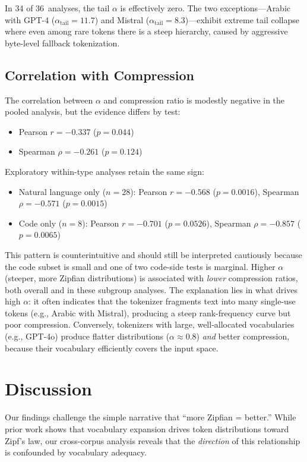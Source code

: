 \documentclass[11pt]{article}
\begin{document}
In 34 of 36~analyses, the tail $\alpha$ is effectively zero.
The two exceptions---Arabic with GPT-4 ($\alpha_\text{tail} = 11.7$) and Mistral ($\alpha_\text{tail} = 8.3$)---exhibit extreme tail collapse where even among rare tokens there is a steep hierarchy, caused by aggressive byte-level fallback tokenization.

\subsection{Correlation with Compression}

The correlation between $\alpha$ and compression ratio is modestly negative in the pooled analysis, but the evidence differs by test:
\begin{itemize}
  \item Pearson $r = -0.337$ ($p = 0.044$)
  \item Spearman $\rho = -0.261$ ($p = 0.124$)
\end{itemize}

Exploratory within-type analyses retain the same sign:
\begin{itemize}
  \item Natural language only ($n=28$): Pearson $r=-0.568$ ($p=0.0016$), Spearman $\rho=-0.571$ ($p=0.0015$)
  \item Code only ($n=8$): Pearson $r=-0.701$ ($p=0.0526$), Spearman $\rho=-0.857$ ($p=0.0065$)
\end{itemize}

This pattern is counterintuitive and should still be interpreted cautiously because the code subset is small and one of two code-side tests is marginal.
Higher $\alpha$ (steeper, more Zipfian distributions) is associated with \emph{lower} compression ratios, both overall and in these subgroup analyses.
The explanation lies in what drives high $\alpha$: it often indicates that the tokenizer fragments text into many single-use tokens (e.g., Arabic with Mistral), producing a steep rank-frequency curve but poor compression.
Conversely, tokenizers with large, well-allocated vocabularies (e.g., GPT-4o) produce flatter distributions ($\alpha \approx 0.8$) \emph{and} better compression, because their vocabulary efficiently covers the input space.

\section{Discussion}

Our findings challenge the simple narrative that ``more Zipfian = better.''
While prior work shows that vocabulary expansion drives token distributions toward Zipf's law, our cross-corpus analysis reveals that the \emph{direction} of this relationship is confounded by vocabulary adequacy.
\end{document}
